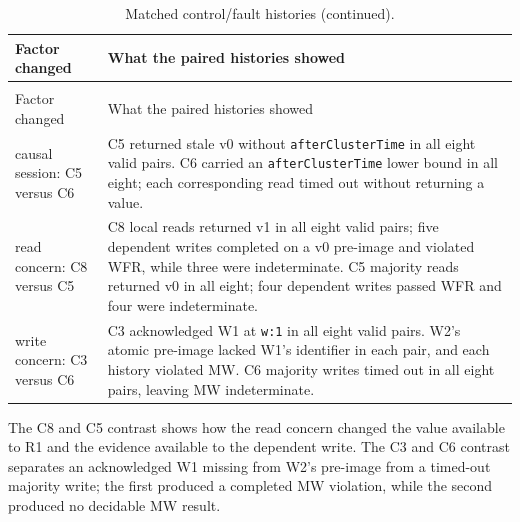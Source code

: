 {\small
\setlength{\tabcolsep}{3pt}
\begin{longtable}{@{}p{3.3cm}p{11.5cm}@{}}
\caption{Summary of matched control/fault histories.}
\label{tab:matched-control-fault-histories}\\
\toprule
Factor changed & What the paired histories showed \\
\midrule
\endfirsthead
\caption[]{Matched control/fault histories (continued).}\\
\toprule
Factor changed & What the paired histories showed \\
\midrule
\endhead
\bottomrule
\endfoot
causal session: C5 versus C6 & C5 returned stale v0 without \texttt{afterClusterTime} in all eight valid pairs. C6 carried an \texttt{afterClusterTime} lower bound in all eight; each corresponding read timed out without returning a value. \\
read concern: C8 versus C5 & C8 local reads returned v1 in all eight valid pairs; five dependent writes completed on a v0 pre-image and violated WFR, while three were indeterminate. C5 majority reads returned v0 in all eight; four dependent writes passed WFR and four were indeterminate. \\
write concern: C3 versus C6 & C3 acknowledged W1 at \texttt{w:1} in all eight valid pairs. W2's atomic pre-image lacked W1's identifier in each pair, and each history violated MW. C6 majority writes timed out in all eight pairs, leaving MW indeterminate. \\
\end{longtable}
}

The C8 and C5 contrast shows how the read concern changed the value available
to R1 and the evidence available to the dependent write. The C3 and C6 contrast
separates an acknowledged W1 missing from W2's pre-image from a timed-out
majority write; the first produced a completed MW violation, while the second
produced no decidable MW result.
